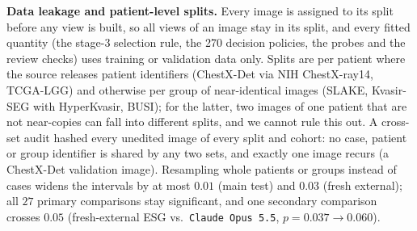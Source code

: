 \documentclass[journal]{IEEEtran}
\begin{document}
\textbf{Data leakage and patient-level splits.} Every image is assigned to its split before any view is built, so all views of an image stay in its split, and every fitted quantity (the stage-3 selection rule, the 270 decision policies, the probes and the review checks) uses training or validation data only. Splits are per patient where the source releases patient identifiers (ChestX-Det via NIH ChestX-ray14, TCGA-LGG) and otherwise per group of near-identical images (SLAKE, Kvasir-SEG with HyperKvasir, BUSI); for the latter, two images of one patient that are not near-copies can fall into different splits, and we cannot rule this out. A cross-set audit hashed every unedited image of every split and cohort: no case, patient or group identifier is shared by any two sets, and exactly one image recurs (a ChestX-Det validation image). Resampling whole patients or groups instead of cases widens the intervals by at most $0.01$ (main test) and $0.03$ (fresh external); all $27$ primary comparisons stay significant, and one secondary comparison crosses $0.05$ (fresh-external ESG vs.\ \texttt{Claude Opus 5.5}, $p = 0.037 \to 0.060$).
\end{document}
